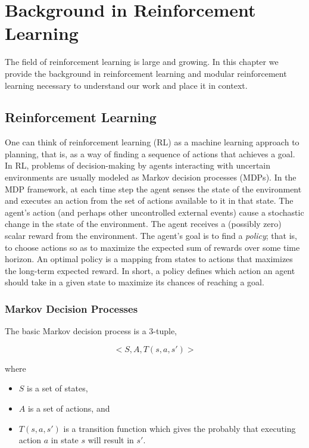 \chapter{Background in Reinforcement Learning}\label{ch:rl}

The field of reinforcement learning is large and growing. In this chapter we provide the background in reinforcement learning and modular reinforcement learning necessary to understand our work and place it in context.

\section{Reinforcement Learning}

One can think of reinforcement learning (RL) \cite{sutton1998reinforcement,kaelbling1996reinforcement} as a machine learning approach to planning, that is, as a way of finding a sequence of actions that achieves a goal. In RL, problems of decision-making by agents interacting with uncertain environments are usually modeled as Markov decision processes (MDPs). In the MDP framework, at each time step the agent senses the state of the environment and executes an action from the set of actions available to it in that state. The agent's action (and perhaps other uncontrolled external events) cause a stochastic change in the state of the environment. The agent receives a (possibly zero) scalar reward from the environment. The agent's goal is to find a {\it policy}; that is, to choose actions so as to maximize the expected sum of rewards over some time horizon. An optimal policy is a mapping from states to actions that maximizes the long-term expected reward.  In short, a policy defines which action an agent should take in a given state to maximize its chances of reaching a goal.

\subsection{Markov Decision Processes}

The basic Markov decision process is a 3-tuple,

\begin{equation}
<S, A, T(s, a, s')>
\end{equation}

where

\begin{itemize}
\item $S$ is a set of states,
\item $A$ is a set of actions, and
\item $T(s, a, s')$ is a transition function which gives the probably that executing action $a$ in state $s$ will result in $s'$.
\end{itemize}

